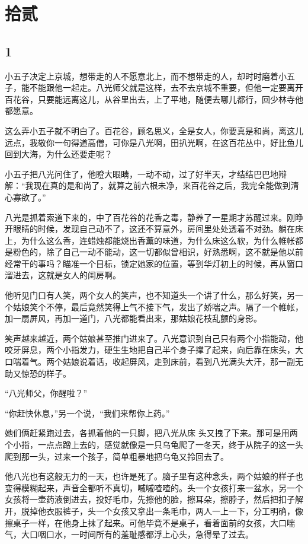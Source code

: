 \section{拾贰}

{\centering\subsection{1}}

小五子决定上京城，想带走的人不愿意北上，而不想带走的人，却时时磨着小五子，能不能跟他一起走。八光师父就是这样，去不去京城不重要，但他一定要离开百花谷，只要能远离这儿，从谷里出去，上了平地，随便去哪儿都行，回少林寺他都愿意。

这么弄小五子就不明白了。百花谷，顾名思义，全是女人，你要真是和尚，离这儿远点，我敬你一句得道高僧，可你是八光啊，田扒光啊，在这百花丛中，好比鱼儿回到大海，为什么还要走呢？

小五子把八光问住了，他瞪大眼睛，一动不动，过了好半天，才结结巴巴地辩解：“我现在真的是和尚了，就算之前六根未净，来百花谷之后，我完全能做到清心寡欲了。”

八光是抓着索道下来的，中了百花谷的花香之毒，静养了一星期才苏醒过来。刚睁开眼睛的时候，发现自己动不了，这还不算意外，房间里处处透着不对劲。躺在床
上，为什么这么香，连蜡烛都能烧出香薰的味道，为什么床这么软，为什么帷帐都是粉色的，除了自己一动不能动，这一切都似曾相识，好熟悉啊，这不就是他以前经常干的事吗？瞄准一个目标，锁定她家的位置，等到华灯初上的时候，再从窗口溜进去，这就是女人的闺房啊。

他听见门口有人笑，两个女人的笑声，也不知道头一个讲了什么，那么好笑，另一个姑娘笑个不停，最后竟然笑得上气不接下气，发出了娇喘之声。隔了一个帷帐，加一扇屏风，再加一道门，八光都能看出来，那姑娘花枝乱颤的身影。

笑声越来越近，两个姑娘甚至推门进来了。八光意识到自己只有两个小指能动，他咬牙屏息，两个小指发力，硬生生地把自己半个身子撑了起来，向后靠在床头，大口喘着气。两个姑娘说着话，收起屏风，走到床前，看到八光满头大汗，那一副无助又惊恐的样子。

“八光师父，你醒啦？”

“你赶快休息，”另一个说，“我们来帮你上药。”

她们俩赶紧跑过去，各抓着他的一只脚，把八光从床
头又拽了下来。那可是用两个小指，一点点蹭上去的，感觉就像是一只乌龟爬了一冬天，终于从院子的这一头爬到那一头，过来一个孩子，简单粗暴地把乌龟又拎回去了。

他八光也有这般无力的一天，也许是死了。脑子里有这种念头，两个姑娘的样子也变得模糊起来，声音全都听不真切，嘁嘁喳喳的。头一个女孩打来一盆水，另一个女孩将一壶药液倒进去，投好毛巾，先擦他的脸，擦耳朵，擦脖子，然后把扣子解开，脱掉他衣服裤子，头一个女孩又拿出一条毛巾，两人一上一下，分工明确，像擦桌子一样，在他身上抹了起来。可他毕竟不是桌子，看着面前的女孩，大口喘气，大口咽口水，一时间所有的羞耻感都浮上心头，急得晕了过去。

